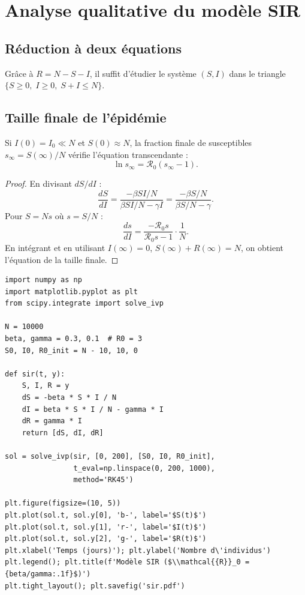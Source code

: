 \section{Analyse qualitative du mod\`ele SIR}

\subsection{R\'eduction \`a deux \'equations}

Gr\^ace \`a $R=N-S-I$, il suffit d'\'etudier le syst\`eme
$(S,I)$ dans le triangle $\{S\geq 0,\;I\geq 0,\;S+I\leq N\}$.

\subsection{Taille finale de l'\'epid\'emie}

\begin{theoreme}
Si $I(0)=I_0\ll N$ et $S(0)\approx N$, la fraction finale de
susceptibles $s_\infty = S(\infty)/N$ v\'erifie l'\'equation
transcendante :
\[
  \ln s_\infty = \mathcal{R}_0(s_\infty - 1).
\]
\end{theoreme}

\begin{proof}
En divisant $dS/dI$ :
\[
  \frac{dS}{dI} = \frac{-\beta SI/N}{\beta SI/N - \gamma I}
  = \frac{-\beta S/N}{\beta S/N - \gamma}.
\]
Pour $S=N s$ o\`u $s=S/N$ :
\[
  \frac{ds}{dI} = \frac{-\mathcal{R}_0 s}{\mathcal{R}_0 s - 1}\cdot\frac{1}{N}.
\]
En int\'egrant et en utilisant $I(\infty)=0$, $S(\infty)+R(\infty)=N$,
on obtient l'\'equation de la taille finale.
\end{proof}

\begin{codeblock}[title=\textbf{Simulation du mod\`ele SIR}]
\begin{verbatim}
import numpy as np
import matplotlib.pyplot as plt
from scipy.integrate import solve_ivp

N = 10000
beta, gamma = 0.3, 0.1  # R0 = 3
S0, I0, R0_init = N - 10, 10, 0

def sir(t, y):
    S, I, R = y
    dS = -beta * S * I / N
    dI = beta * S * I / N - gamma * I
    dR = gamma * I
    return [dS, dI, dR]

sol = solve_ivp(sir, [0, 200], [S0, I0, R0_init],
                t_eval=np.linspace(0, 200, 1000),
                method='RK45')

plt.figure(figsize=(10, 5))
plt.plot(sol.t, sol.y[0], 'b-', label='$S(t)$')
plt.plot(sol.t, sol.y[1], 'r-', label='$I(t)$')
plt.plot(sol.t, sol.y[2], 'g-', label='$R(t)$')
plt.xlabel('Temps (jours)'); plt.ylabel('Nombre d\'individus')
plt.legend(); plt.title(f'Modèle SIR ($\\mathcal{{R}}_0 = {beta/gamma:.1f}$)')
plt.tight_layout(); plt.savefig('sir.pdf')
\end{verbatim}
\end{codeblock}

